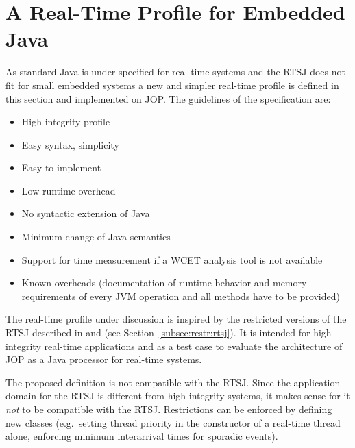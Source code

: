 
\section{A Real-Time Profile for Embedded Java}
\label{sec:rtprof}

As standard Java is under-specified for real-time systems and the
RTSJ does not fit for small embedded systems a new and simpler
real-time profile is defined in this section and implemented on JOP.
The guidelines of the specification are:

\begin{itemize}
\item High-integrity profile
\item Easy syntax, simplicity
\item Easy to implement
\item Low runtime overhead
\item No syntactic extension of Java
\item Minimum change of Java semantics
\item Support for time measurement if a WCET analysis tool is not available
\item Known overheads (documentation of runtime behavior and memory
requirements of every JVM operation and all methods have to be
provided)
\end{itemize}

The real-time profile under discussion is inspired by the restricted
versions of the RTSJ described in \cite{Pusch01} and \cite{583825}
(see Section~\ref{subsec:restr:rtsj}). It is intended for
high-integrity real-time applications and as a test case to evaluate
the architecture of JOP as a Java processor for real-time systems.

The proposed definition is not compatible with the RTSJ. Since the
application domain for the RTSJ is different from high-integrity
systems, it makes sense for it \emph{not} to be compatible with the
RTSJ. Restrictions can be enforced by defining new classes (e.g.\
setting thread priority in the constructor of a real-time thread
alone, enforcing minimum interarrival times for sporadic events).


